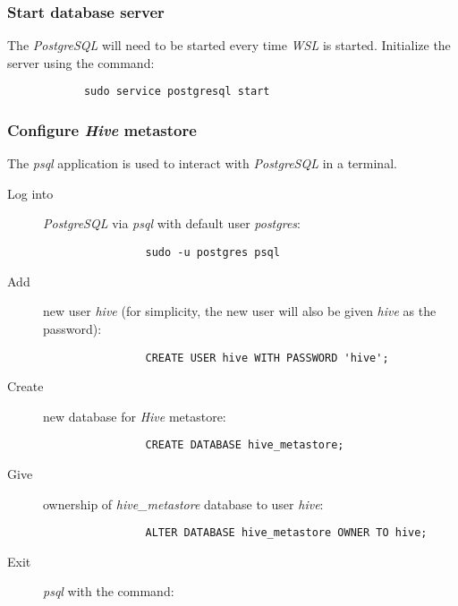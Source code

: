 \documentclass{article}
\begin{document}
        \subsubsection{Start database server}
        \label{subsec:pgsstart}
        The \emph{PostgreSQL} will need to be started every time \emph{WSL} is started. Initialize the
        server using the command:
        \begin{verbatim}
            sudo service postgresql start
        \end{verbatim}

        \subsubsection{Configure \emph{Hive} metastore}
        The \emph{psql} application is used to interact with \emph{PostgreSQL} in a terminal.
        \begin{description}
            \item[Log into] \emph{PostgreSQL} via \emph{psql} with default user \emph{postgres}:
            \begin{verbatim}
                sudo -u postgres psql 
            \end{verbatim}

            \item[Add] new user \emph{hive}
            (for simplicity, the new user will also be given \emph{hive} as the password):
            \begin{verbatim}
                CREATE USER hive WITH PASSWORD 'hive';
            \end{verbatim}

            \item[Create] new database for \emph{Hive} metastore:
            \begin{verbatim}
                CREATE DATABASE hive_metastore;
            \end{verbatim}

            \item[Give] ownership of \emph{hive\_metastore} database to user \emph{hive}:
            \begin{verbatim}
                ALTER DATABASE hive_metastore OWNER TO hive;
            \end{verbatim}

            \item[Exit] \emph{psql} with the command: \texttt{\q}
        \end{description}
\end{document}
